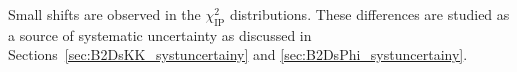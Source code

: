 Small shifts are observed in the $\chi^{2}_{\text{IP}}$ distributions. These differences are studied as a source of systematic uncertainty as discussed in Sections~\ref{sec:B2DsKK_systuncertainy} and \ref{sec:B2DsPhi_systuncertainy}.





